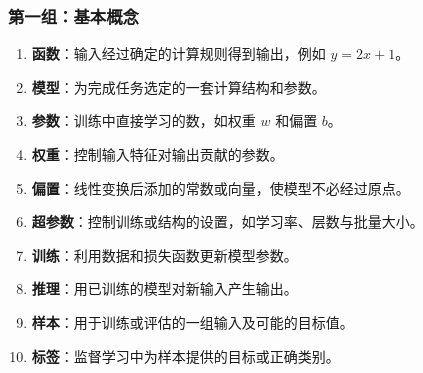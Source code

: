 \subsubsection{第一组：基本概念}
\begin{enumerate}[leftmargin=2.5em,itemsep=4pt,start=1]
\item \textbf{函数}：输入经过确定的计算规则得到输出，例如 $y=2x+1$。 
\item \textbf{模型}：为完成任务选定的一套计算结构和参数。 
\item \textbf{参数}：训练中直接学习的数，如权重 $w$ 和偏置 $b$。 
\item \textbf{权重}：控制输入特征对输出贡献的参数。 
\item \textbf{偏置}：线性变换后添加的常数或向量，使模型不必经过原点。 
\item \textbf{超参数}：控制训练或结构的设置，如学习率、层数与批量大小。 
\item \textbf{训练}：利用数据和损失函数更新模型参数。 
\item \textbf{推理}：用已训练的模型对新输入产生输出。 
\item \textbf{样本}：用于训练或评估的一组输入及可能的目标值。 
\item \textbf{标签}：监督学习中为样本提供的目标或正确类别。 
\end{enumerate}

